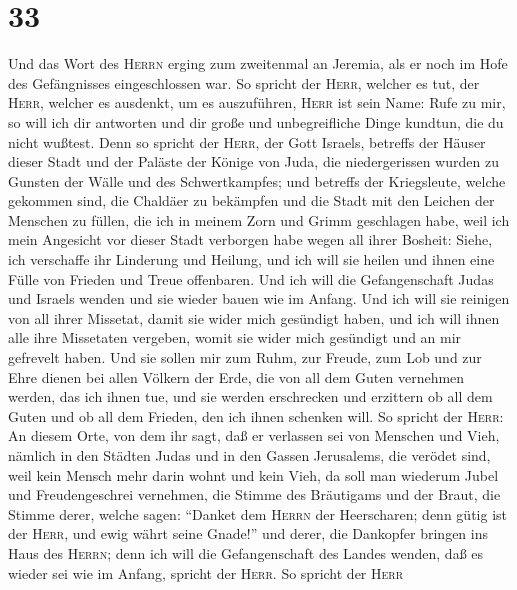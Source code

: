 \hypertarget{section-32}{%
\section{33}\label{section-32}}

 Und das Wort des \textsc{Herrn} erging zum zweitenmal an
Jeremia, als er noch im Hofe des Gefängnisses eingeschlossen war.
 So spricht der \textsc{Herr}, welcher es tut, der
\textsc{Herr}, welcher es ausdenkt, um es auszuführen, \textsc{Herr} ist
sein Name:  Rufe zu mir, so will ich dir antworten und dir
große und unbegreifliche Dinge kundtun, die du nicht wußtest.
 Denn so spricht der \textsc{Herr}, der Gott Israels,
betreffs der Häuser dieser Stadt und der Paläste der Könige von Juda,
die niedergerissen wurden zu Gunsten der Wälle und des Schwertkampfes;
 und betreffs der Kriegsleute, welche gekommen sind, die
Chaldäer zu bekämpfen und die Stadt mit den Leichen der Menschen zu
füllen, die ich in meinem Zorn und Grimm geschlagen habe, weil ich mein
Angesicht vor dieser Stadt verborgen habe wegen all ihrer Bosheit:
 Siehe, ich verschaffe ihr Linderung und Heilung, und ich
will sie heilen und ihnen eine Fülle von Frieden und Treue offenbaren.
 Und ich will die Gefangenschaft Judas und Israels wenden
und sie wieder bauen wie im Anfang.  Und ich will sie
reinigen von all ihrer Missetat, damit sie wider mich gesündigt haben,
und ich will ihnen alle ihre Missetaten vergeben, womit sie wider mich
gesündigt und an mir gefrevelt haben.  Und sie sollen mir
zum Ruhm, zur Freude, zum Lob und zur Ehre dienen bei allen Völkern der
Erde, die von all dem Guten vernehmen werden, das ich ihnen tue, und sie
werden erschrecken und erzittern ob all dem Guten und ob all dem
Frieden, den ich ihnen schenken will.  So spricht der
\textsc{Herr}: An diesem Orte, von dem ihr sagt, daß er verlassen sei
von Menschen und Vieh, nämlich in den Städten Judas und in den Gassen
Jerusalems, die verödet sind, weil kein Mensch mehr darin wohnt und kein
Vieh,  da soll man wiederum Jubel und Freudengeschrei
vernehmen, die Stimme des Bräutigams und der Braut, die Stimme derer,
welche sagen: ``Danket dem \textsc{Herrn} der Heerscharen; denn gütig
ist der \textsc{Herr}, und ewig währt seine Gnade!'' und derer, die
Dankopfer bringen ins Haus des \textsc{Herrn}; denn ich will die
Gefangenschaft des Landes wenden, daß es wieder sei wie im Anfang,
spricht der \textsc{Herr}.  So spricht der \textsc{Herr}
